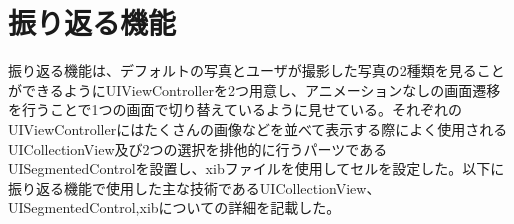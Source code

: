 \section{振り返る機能}
振り返る機能は、デフォルトの写真とユーザが撮影した写真の2種類を見ることができるようにUIViewControllerを2つ用意し、アニメーションなしの画面遷移を行うことで1つの画面で切り替えているように見せている。それぞれのUIViewControllerにはたくさんの画像などを並べて表示する際によく使用されるUICollectionView及び2つの選択を排他的に行うパーツであるUISegmentedControlを設置し、xibファイルを使用してセルを設定した。以下に振り返る機能で使用した主な技術であるUICollectionView、UISegmentedControl,xibについての詳細を記載した。

